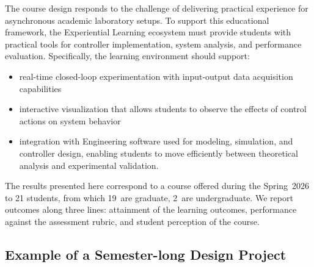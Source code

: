 \documentclass[journal]{IEEEtran}
\begin{document}
The course design responds to the challenge of delivering practical experience
for asynchronous academic laboratory setups.
To support this educational framework, the Experiential Learning ecosystem must provide students with practical tools for controller implementation, system analysis, and performance evaluation. Specifically, the learning environment should support:
\begin{itemize}
    \item real-time closed-loop experimentation with input-output data acquisition capabilities
    \item interactive visualization that allows students to observe the effects of control actions on system behavior
    \item integration with Engineering software used for modeling, simulation, and controller design, enabling students to move efficiently between theoretical analysis and experimental validation.
\end{itemize}


The results presented here correspond to a course offered during the Spring~2026 to 21 students, from which 19~are graduate,
2~are undergraduate. We report outcomes along three lines: attainment of
the learning outcomes, performance against the assessment rubric, and student perception of the course.

\subsection{Example of a Semester-long Design Project}
\label{subsec:representative-project}
\end{document}
